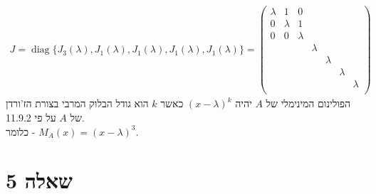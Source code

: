 \documentclass{article}
\DeclareMathOperator{\diag}{diag}
\begin{document}
\begin{align*}
    J=\diag\{ J_3(\lambda), J_1(\lambda), J_1(\lambda), J_1(\lambda), J_1(\lambda) \}=\begin{pmatrix}
                                                                                          \lambda & 1       & 0                                               \\
                                                                                          0       & \lambda & 1                                               \\
                                                                                          0       & 0       & \lambda &                                       \\
                                                                                                  &         &         & \lambda                               \\
                                                                                                  &         &         &         & \lambda                     \\
                                                                                                  &         &         &         &         & \lambda           \\
                                                                                                  &         &         &         &         &         & \lambda \\
                                                                                      \end{pmatrix}
\end{align*}
הפולינום המינימלי של $A$ יהיה $(x-\lambda)^k$ כאשר $k$ הוא גודל הבלוק המרבי בצורת הז'ורדן של $A$ על פי 11.9.2. \\
כלומר - $M_A(x)=(x-\lambda)^3$.

\pagebreak

\section*{שאלה 5}
\end{document}

